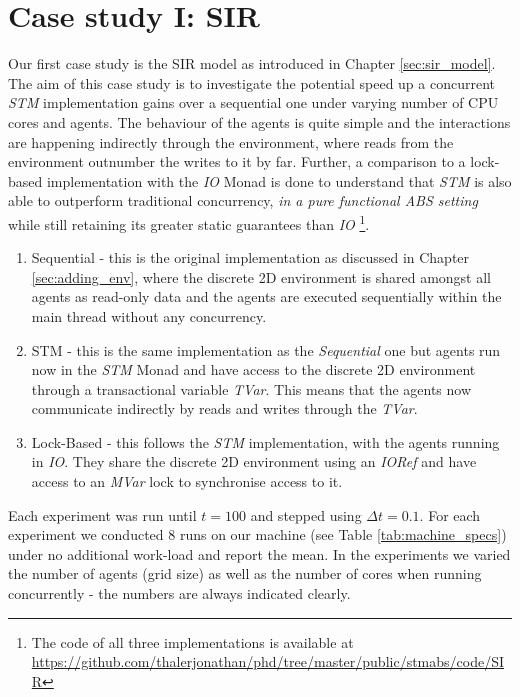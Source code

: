 \section{Case study I: SIR}
\label{sec:concurrent_sir}
Our first case study is the SIR model as introduced in Chapter \ref{sec:sir_model}. The aim of this case study is to investigate the potential speed up a concurrent \textit{STM} implementation gains over a sequential one under varying number of CPU cores and agents. The behaviour of the agents is quite simple and the interactions are happening indirectly through the environment, where reads from the environment outnumber the writes to it by far. Further, a comparison to a lock-based implementation with the \textit{IO} Monad is done to understand that \textit{STM} is also able to outperform traditional concurrency, \textit{in a pure functional ABS setting} while still retaining its greater static guarantees than \textit{IO} \footnote{The code of all three implementations is available at \url{https://github.com/thalerjonathan/phd/tree/master/public/stmabs/code/SIR}}.

\begin{enumerate}
	\item Sequential - this is the original implementation as discussed in Chapter \ref{sec:adding_env}, where the discrete 2D environment is shared amongst all agents as read-only data and the agents are executed sequentially within the main thread without any concurrency.
	\item STM - this is the same implementation as the \textit{Sequential} one but agents run now in the \textit{STM} Monad and have access to the discrete 2D environment through a transactional variable \textit{TVar}. This means that the agents now communicate indirectly by reads and writes through the \textit{TVar}.
	\item Lock-Based - this follows the \textit{STM} implementation, with the agents running in \textit{IO}. They share the discrete 2D environment using an \textit{IORef} and have access to an \textit{MVar} lock to synchronise access to it.
\end{enumerate}

Each experiment was run until $t = 100$ and stepped using $\Delta t = 0.1$. For each experiment we conducted 8 runs on our machine (see Table \ref{tab:machine_specs}) under no additional work-load and report the mean. %
In the experiments we varied the number of agents (grid size) as well as the number of cores when running concurrently - the numbers are always indicated clearly.

